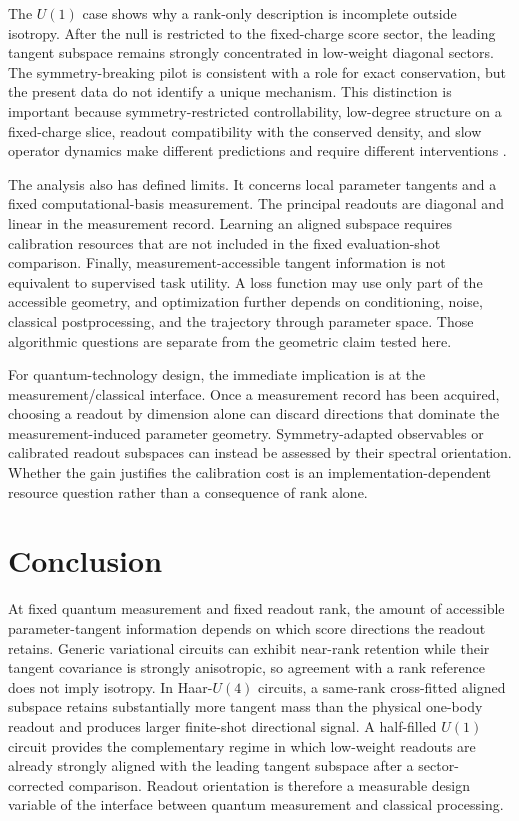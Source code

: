 The $U(1)$ case shows why a rank-only description is incomplete outside isotropy. After the null is restricted to the fixed-charge score sector, the leading tangent subspace remains strongly concentrated in low-weight diagonal sectors. The symmetry-breaking pilot is consistent with a role for exact conservation, but the present data do not identify a unique mechanism. This distinction is important because symmetry-restricted controllability, low-degree structure on a fixed-charge slice, readout compatibility with the conserved density, and slow operator dynamics make different predictions and require different interventions \cite{Monbroussou2025,Fontana2024,Ragone2024,Filmus2016,Khemani2018,Rakovszky2018}.

The analysis also has defined limits. It concerns local parameter tangents and a fixed computational-basis measurement. The principal readouts are diagonal and linear in the measurement record. Learning an aligned subspace requires calibration resources that are not included in the fixed evaluation-shot comparison. Finally, measurement-accessible tangent information is not equivalent to supervised task utility. A loss function may use only part of the accessible geometry, and optimization further depends on conditioning, noise, classical postprocessing, and the trajectory through parameter space. Those algorithmic questions are separate from the geometric claim tested here.

For quantum-technology design, the immediate implication is at the measurement/classical interface. Once a measurement record has been acquired, choosing a readout by dimension alone can discard directions that dominate the measurement-induced parameter geometry. Symmetry-adapted observables or calibrated readout subspaces can instead be assessed by their spectral orientation. Whether the gain justifies the calibration cost is an implementation-dependent resource question rather than a consequence of rank alone.

\section{Conclusion}

At fixed quantum measurement and fixed readout rank, the amount of accessible parameter-tangent information depends on which score directions the readout retains. Generic variational circuits can exhibit near-rank retention while their tangent covariance is strongly anisotropic, so agreement with a rank reference does not imply isotropy. In Haar-$U(4)$ circuits, a same-rank cross-fitted aligned subspace retains substantially more tangent mass than the physical one-body readout and produces larger finite-shot directional signal. A half-filled $U(1)$ circuit provides the complementary regime in which low-weight readouts are already strongly aligned with the leading tangent subspace after a sector-corrected comparison. Readout orientation is therefore a measurable design variable of the interface between quantum measurement and classical processing.
